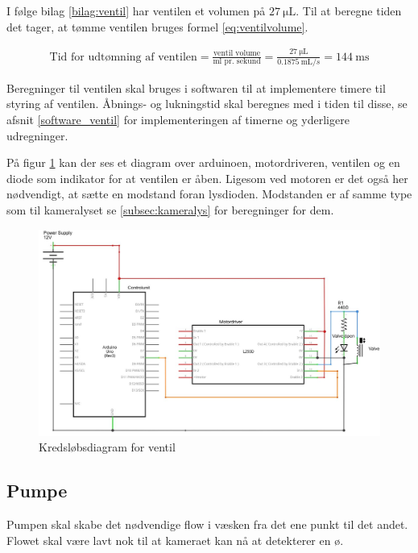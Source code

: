 I følge bilag \ref{bilag:ventil} har ventilen et volumen på $\SI{27}{\micro\liter}$. Til at beregne tiden det tager, at tømme ventilen bruges formel \ref{eq:ventilvolume}. %

\begin{align}
\text{Tid for udtømning af ventilen} = \frac{\text{ventil volume}}{\text{ml pr. sekund}}=\frac{\SI{27}{\micro\liter}}{\SI{0,1875}{\milli\liter/s}}=\SI{144}{\milli\second}
\label{eq:ventilvolume}
\end{align}

Beregninger til ventilen skal bruges i softwaren til at implementere timere til styring af ventilen. Åbnings- og lukningstid skal beregnes med i tiden til disse, se afsnit \ref{software_ventil} for implementeringen af timerne og yderligere udregninger.

\newpage
 På figur \ref{fig:ventildiagram} kan der ses et diagram over arduinoen, motordriveren, ventilen og en diode som indikator for at ventilen er åben. Ligesom ved motoren er det også her nødvendigt, at sætte en modstand foran lysdioden. Modstanden er af samme type som til kameralyset se \ref{subsec:kameralys} for beregninger for dem.

\begin{figure}[H]
	\centering
	\includegraphics[width=1\textwidth]{billeder/Hardware/diagrammer/ventildiagram.JPG}
	\caption{Kredsløbsdiagram for ventil}
	\label{fig:ventildiagram}
\end{figure} 

\newpage
\subsection{Pumpe}
Pumpen skal skabe det nødvendige flow i væsken fra det ene punkt til det andet. Flowet skal være lavt nok til at kameraet kan nå at detekterer en ø.

